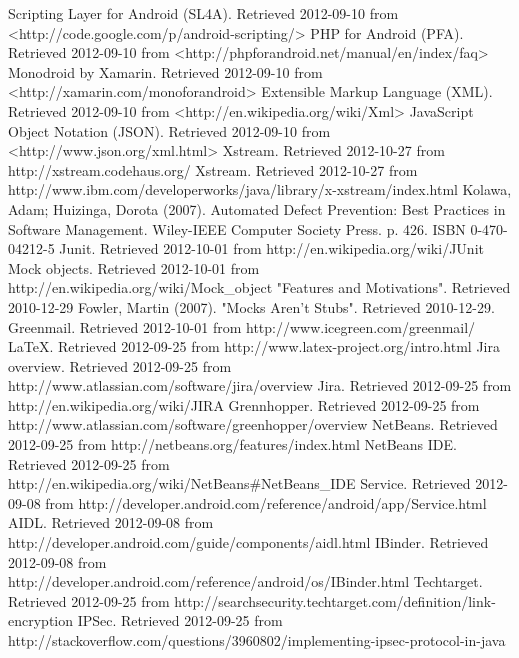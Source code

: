 \documentclass[12pt]{report}
\begin{document}
\begin{thebibliography}{99}
 Scripting Layer for Android (SL4A). Retrieved 2012-09-10 from <http://code.google.com/p/android-scripting/>
 PHP for Android (PFA). Retrieved 2012-09-10 from <http://phpforandroid.net/manual/en/index/faq>
 Monodroid by Xamarin. Retrieved 2012-09-10 from <http://xamarin.com/monoforandroid>
 Extensible Markup Language (XML). Retrieved 2012-09-10 from <http://en.wikipedia.org/wiki/Xml>
 JavaScript Object Notation (JSON). Retrieved 2012-09-10 from <http://www.json.org/xml.html>
 Xstream. Retrieved 2012-10-27 from http://xstream.codehaus.org/
 Xstream. Retrieved 2012-10-27 from http://www.ibm.com/developerworks/java/library/x-xstream/index.html
 Kolawa, Adam; Huizinga, Dorota (2007). Automated Defect Prevention: Best Practices in Software Management. Wiley-IEEE Computer Society Press. p. 426. ISBN 0-470-04212-5
 Junit. Retrieved 2012-10-01 from http://en.wikipedia.org/wiki/JUnit
 Mock objects. Retrieved 2012-10-01 from http://en.wikipedia.org/wiki/Mock\_object
 "Features and Motivations". Retrieved 2010-12-29
 Fowler, Martin (2007). "Mocks Aren't Stubs". Retrieved 2010-12-29.
 Greenmail. Retrieved 2012-10-01 from http://www.icegreen.com/greenmail/
 LaTeX. Retrieved 2012-09-25 from http://www.latex-project.org/intro.html
 Jira overview. Retrieved 2012-09-25 from http://www.atlassian.com/software/jira/overview
 Jira. Retrieved 2012-09-25 from http://en.wikipedia.org/wiki/JIRA
 Grennhopper. Retrieved 2012-09-25 from http://www.atlassian.com/software/greenhopper/overview
 NetBeans. Retrieved 2012-09-25 from http://netbeans.org/features/index.html
 NetBeans IDE. Retrieved 2012-09-25 from http://en.wikipedia.org/wiki/NetBeans\#NetBeans\_IDE
 Service. Retrieved 2012-09-08 from http://developer.android.com/reference/android/app/Service.html
 AIDL. Retrieved 2012-09-08 from http://developer.android.com/guide/components/aidl.html
 IBinder. Retrieved 2012-09-08 from http://developer.android.com/reference/android/os/IBinder.html
 Techtarget. Retrieved 2012-09-25 from http://searchsecurity.techtarget.com/definition/link-encryption
 IPSec. Retrieved 2012-09-25 from http://stackoverflow.com/questions/3960802/implementing-ipsec-protocol-in-java

\end{thebibliography}
\end{document}
